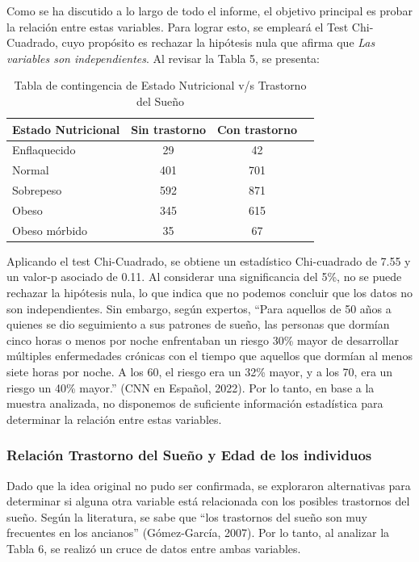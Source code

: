 \documentclass[
  10pt,
  letterpaper,
  DIV=11,
  numbers=noendperiod,
  twocolumn]{scrartcl}
\begin{document}
Como se ha discutido a lo largo de todo el informe, el objetivo
principal es probar la relación entre estas variables. Para lograr esto,
se empleará el Test Chi-Cuadrado, cuyo propósito es rechazar la
hipótesis nula que afirma que \emph{Las variables son independientes}.
Al revisar la Tabla 5, se presenta:

\begin{table}[H]
  \centering
  \begin{tabular}{lccc}
    \toprule
    Estado Nutricional & Sin trastorno & Con trastorno\\
    \midrule
    Enflaquecido  &   29 &  42 \\
    Normal        &  401 & 701 \\
    Sobrepeso     &  592 & 871 \\
    Obeso         &  345 & 615 \\
    Obeso mórbido &   35 &  67 \\
    \bottomrule
  \end{tabular}
  \caption{Tabla de contingencia de Estado Nutricional v/s Trastorno del Sueño}
  
\end{table}

Aplicando el test Chi-Cuadrado, se obtiene un estadístico Chi-cuadrado
de 7.55 y un valor-p asociado de 0.11. Al considerar una significancia
del 5\%, no se puede rechazar la hipótesis nula, lo que indica que no
podemos concluir que los datos no son independientes. Sin embargo, según
expertos, ``Para aquellos de 50 años a quienes se dio seguimiento a sus
patrones de sueño, las personas que dormían cinco horas o menos por
noche enfrentaban un riesgo 30\% mayor de desarrollar múltiples
enfermedades crónicas con el tiempo que aquellos que dormían al menos
siete horas por noche. A los 60, el riesgo era un 32\% mayor, y a los
70, era un riesgo un 40\% mayor.'' (CNN en Español, 2022). Por lo tanto,
en base a la muestra analizada, no disponemos de suficiente información
estadística para determinar la relación entre estas variables.

\hypertarget{relaciuxf3n-trastorno-del-sueuxf1o-y-edad-de-los-individuos}{%
\subsubsection{Relación Trastorno del Sueño y Edad de los
individuos}\label{relaciuxf3n-trastorno-del-sueuxf1o-y-edad-de-los-individuos}}

Dado que la idea original no pudo ser confirmada, se exploraron
alternativas para determinar si alguna otra variable está relacionada
con los posibles trastornos del sueño. Según la literatura, se sabe que
``los trastornos del sueño son muy frecuentes en los ancianos''
(Gómez-García, 2007). Por lo tanto, al analizar la Tabla 6, se realizó
un cruce de datos entre ambas variables.
\end{document}
